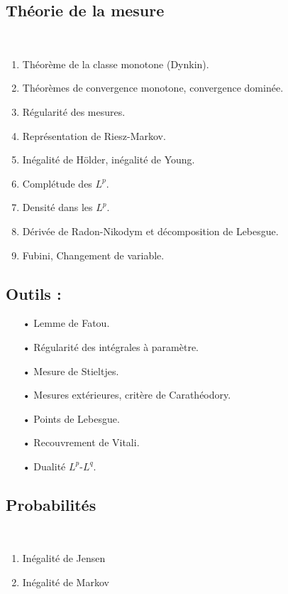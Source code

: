 \documentclass[11pt,a4paper]{article}
\begin{document}
\begin{center}
\section*{Théorie de la mesure} 
\end{center}
~\\
\begin{enumerate}
\item Théorème de la classe monotone (Dynkin).
\item Théorèmes de convergence monotone, convergence dominée.
\item Régularité des mesures.
\item Représentation de Riesz-Markov.
\item Inégalité de Hölder, inégalité de Young.
\item Complétude des $L^p$.
\item Densité dans les $L^p$.
\item Dérivée de Radon-Nikodym et décomposition de Lebesgue.
\item Fubini, Changement de variable.
\end{enumerate}


\subsection*{Outils :}
\begin{itemize}
\item[•] Lemme de Fatou.
\item[•] Régularité des intégrales à paramètre.
\item[•] Mesure de Stieltjes.
\item[•] Mesures extérieures, critère de Carathéodory.
\item[•] Points de Lebesgue.
\item[•] Recouvrement de Vitali.
\item[•] Dualité $L^p$-$L^q$.
\end{itemize}



\newpage\begin{center}
\section*{Probabilités} 
\end{center}
~\\
\begin{enumerate}
\item Inégalité de Jensen
\item Inégalité de Markov
\end{enumerate}
\end{document}

